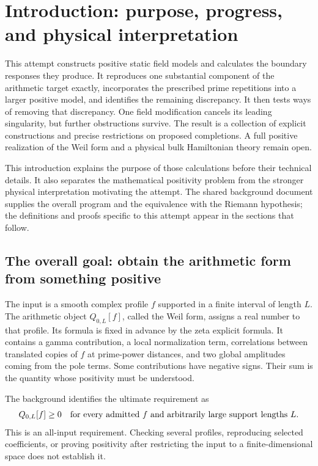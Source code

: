 \documentclass[11pt]{article}
\numberwithin{equation}{section}
\theoremstyle{definition}
\theoremstyle{remark}
\begin{document}
\section*{Introduction: purpose, progress, and physical interpretation}
\label{sec:orientation}
This attempt constructs positive static field models and calculates the boundary responses they produce. It reproduces one substantial component of the arithmetic target exactly, incorporates the prescribed prime repetitions into a larger positive model, and identifies the remaining discrepancy. It then tests ways of removing that discrepancy. One field modification cancels its leading singularity, but further obstructions survive. The result is a collection of explicit constructions and precise restrictions on proposed completions. A full positive realization of the Weil form and a physical bulk Hamiltonian theory remain open.

This introduction explains the purpose of those calculations before their technical details. It also separates the mathematical positivity problem from the stronger physical interpretation motivating the attempt. The shared background document \cite{background} supplies the overall program and the equivalence with the Riemann hypothesis; the definitions and proofs specific to this attempt appear in the sections that follow.

\subsection*{The overall goal: obtain the arithmetic form from something positive}
The input is a smooth complex profile $f$ supported in a finite interval of length $L$. The arithmetic object $Q_{0,L}[f]$, called the Weil form, assigns a real number to that profile. Its formula is fixed in advance by the zeta explicit formula. It contains a gamma contribution, a local normalization term, correlations between translated copies of $f$ at prime-power distances, and two global amplitudes coming from the pole terms. Some contributions have negative signs. Their sum is the quantity whose positivity must be understood.

The background identifies the ultimate requirement as
\[
Q_{0,L}[f]\geq0
\quad\hbox{for every admitted }f\hbox{ and arbitrarily large support lengths }L.
\]
This is an all-input requirement. Checking several profiles, reproducing selected coefficients, or proving positivity after restricting the input to a finite-dimensional space does not establish it.
\end{document}
